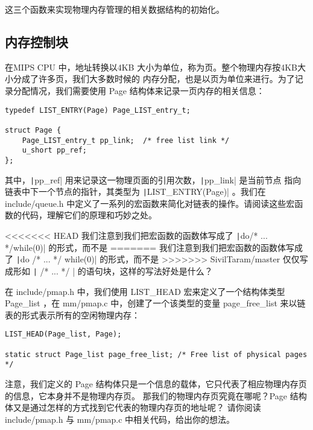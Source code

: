   这三个函数来实现物理内存管理的相关数据结构的初始化。

\subsection{内存控制块}

在MIPS CPU 中，地址转换以4KB 大小为单位，称为页。整个物理内存按4KB大小分成了许多页，我们大多数时候的
内存分配，也是以页为单位来进行。为了记录分配情况，我们需要使用 Page 结构体来记录一页内存的相关信息：

\begin{verbatim}
typedef LIST_ENTRY(Page) Page_LIST_entry_t;

struct Page {
    Page_LIST_entry_t pp_link;  /* free list link */
    u_short pp_ref;
};
\end{verbatim}

其中，\texttt|pp_ref| 用来记录这一物理页面的引用次数，\texttt|pp_link| 是当前节点
指向链表中下一个节点的指针，其类型为 \texttt|LIST_ENTRY(Page)| 。我们在 include/queue.h
中定义了一系列的宏函数来简化对链表的操作。请阅读这些宏函数的代码，理解它们的原理和巧妙之处。

\begin{thinking}\label{think-do_while}
<<<<<<< HEAD
我们注意到我们把宏函数的函数体写成了 \texttt|do{/* ... */}while(0)| 的形式，而不是
=======
我们注意到我们把宏函数的函数体写成了 \texttt|do { /* ... */ } while(0)| 的形式，而不是
>>>>>>> SivilTaram/master
仅仅写成形如
\texttt|{ /* ... */ }| 的语句块，这样的写法好处是什么？
\end{thinking}

在 include/pmap.h 中，我们使用 LIST\_HEAD 宏来定义了一个结构体类型 Page\_list ，在 mm/pmap.c
中，创建了一个该类型的变量 page\_free\_list 来以链表的形式表示所有的空闲物理内存：

\begin{verbatim}
LIST_HEAD(Page_list, Page);

static struct Page_list page_free_list; /* Free list of physical pages */
\end{verbatim}

\begin{thinking}\label{think-Struct page}
注意，我们定义的 Page 结构体只是一个信息的载体，它只代表了相应物理内存页的信息，它本身并不是物理内存页。
那我们的物理内存页究竟在哪呢？Page 结构体又是通过怎样的方式找到它代表的物理内存页的地址呢？
请你阅读 include/pmap.h 与 mm/pmap.c 中相关代码，给出你的想法。
\end{thinking}

